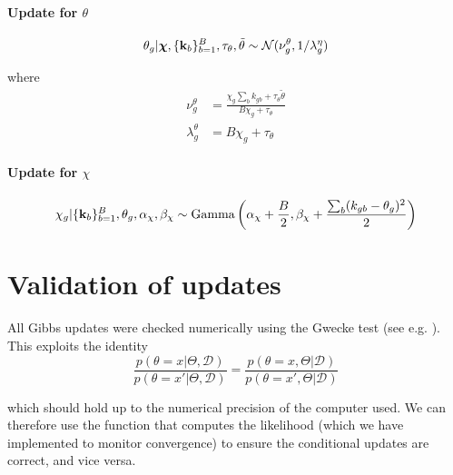 \paragraph{Update for $\theta$}
\begin{equation}
  \theta_g | \bm \chi, \{{\bf k}_b\}_{b=1}^B, \tau_\theta, \tilde{\theta}
  \sim \mathcal{N}(\nu^\theta_g, 1 / \lambda^\eta_g)
\end{equation}

where
\begin{equation}
  \begin{aligned}
    \nu^\theta_g & = \frac{\chi_g \sum_{b} k_{gb}  + \tau_\theta \tilde{\theta}}
    {B \chi_g + \tau_\theta} \\
    \lambda^\theta_g & = B \chi_g + \tau_\theta
  \end{aligned}
\end{equation}

\paragraph{Update for $\chi$}
\begin{equation}
  \chi_g | \{{\bf k}_b\}_{b=1}^B, \theta_g, \alpha_\chi, \beta_\chi
  \sim \text{Gamma} \left(
  \alpha_\chi + \frac{B}{2}, \beta_\chi + \frac{\sum_b (k_{gb} - \theta_g)^2}{2}
  \right)
\end{equation}


\section{Validation of updates}

All Gibbs updates were checked numerically using the Gwecke test (see e.g. \cite{grosse2014testing}). This exploits the identity
\begin{equation}
  \frac{p(\theta = x | \Theta, \mathcal{D})}{p(\theta = x' | \Theta, \mathcal{D})} =
  \frac{p(\theta = x, \Theta | \mathcal{D})}{p(\theta = x', \Theta | \mathcal{D})}
\end{equation}

which should hold up to the numerical precision of the computer used. We can therefore use the function that computes the likelihood (which we have implemented to monitor convergence) to ensure the conditional updates are correct, and vice versa.
